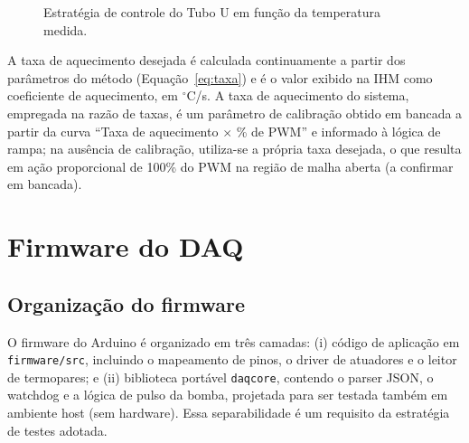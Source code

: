 \begin{figure}[htbp]
\centering
{}
\caption{Estrat\'egia de controle do Tubo U em fun\c{c}\~ao da temperatura medida.}
\label{fig:decisao}
\par{}
\end{figure}

A taxa de aquecimento desejada \'e calculada continuamente a partir dos
par\^ametros do m\'etodo (Equa\c{c}\~ao~\ref{eq:taxa}) e \'e o valor exibido na
IHM como coeficiente de aquecimento, em $^{\circ}$C/s. A taxa de aquecimento do
sistema, empregada na raz\~ao de taxas, \'e um par\^ametro de calibra\c{c}\~ao
obtido em bancada a partir da curva ``Taxa de aquecimento $\times$ \% de PWM'' e
informado \`a l\'ogica de rampa; na aus\^encia de calibra\c{c}\~ao, utiliza-se a
pr\'opria taxa desejada, o que resulta em a\c{c}\~ao proporcional de 100\% do
PWM na regi\~ao de malha aberta (a confirmar em bancada).

\section{Firmware do DAQ}

\subsection{Organiza\c{c}\~ao do firmware}

O firmware do Arduino \'e organizado em tr\^es camadas: (i) c\'odigo de
aplica\c{c}\~ao em \texttt{firmware/}\allowbreak\texttt{src}, incluindo o mapeamento de pinos, o
driver de atuadores e o leitor de termopares; e (ii) biblioteca port\'avel
\texttt{daqcore}, contendo o parser JSON, o watchdog e a l\'ogica de pulso da
bomba, projetada para ser testada tamb\'em em ambiente host (sem hardware). Essa
separabilidade \'e um requisito da estrat\'egia de testes adotada.

